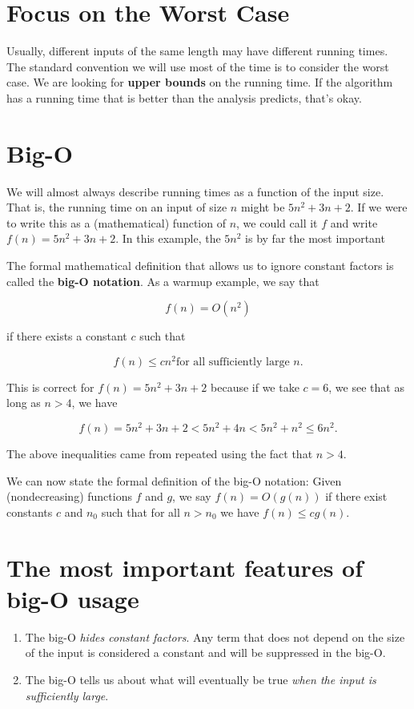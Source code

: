 \section{Focus on the Worst Case}


Usually, different inputs of the same length may have different running times.
The standard convention we will use most of the time is to consider the worst case.
We are looking for \textbf{upper bounds} on the running time.
If the algorithm has a running time that is better than the analysis predicts, that's okay.

\section{Big-O}


We will almost always describe running times as a function of the input size.
That is, the running time on an input of size $n$ might be $5n^2 + 3n + 2$.
If we were to write this as a (mathematical) function of $n$, we could call it $f$ and write $f(n) = 5n^2 + 3n + 2$.
In this example, the $5n^2$ is by far the most important


The formal mathematical definition that allows us to ignore constant factors is called the \textbf{big-O notation}.
As a warmup example, we say that


\[
f(n) = O(n^2)
\]


if there exists a constant $c$ such that


\[
f(n) \le cn^2 \text{for all sufficiently large } n.
\]


This is correct for $f(n) = 5n^2 + 3n + 2$ because if we take $c = 6$, we see that as long as $n > 4$, we have


\[
f(n) = 5n^2 + 3n + 2 < 5n^2 + 4n < 5n^2 + n^2 \le 6n^2.
\]


The above inequalities came from repeated using the fact that $n > 4$.


We can now state the formal definition of the big-O notation:
Given (nondecreasing) functions $f$ and $g$, we say $f(n) = O(g(n))$ if there exist constants $c$ and $n_0$ such that for all $n>n_0$ we have $f(n) \le cg(n)$.

\section{The most important features of big-O usage}

\begin{enumerate}

\item 

The big-O \emph{hides constant factors}.  Any term that does not depend on the size of the input is considered a constant and will be suppressed in the big-O.



\item 

The big-O tells us about what will eventually be true \emph{when the input is sufficiently large}.



\end{enumerate}

